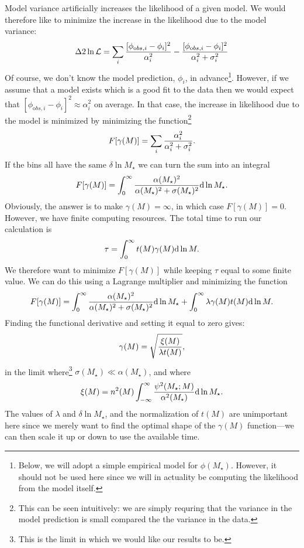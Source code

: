 Model variance artificially increases the likelihood of a given model. We would therefore like to minimize the increase in the likelihood due to the model variance:
\begin{equation}
\Delta 2 \ln \mathcal{L} = \sum_i {[\phi_{{\mathrm obs},i} - \phi_i]^2 \over \alpha_i^2} - {[\phi_{{\mathrm obs},i} - \phi_i]^2 \over \alpha_i^2 + \sigma_i^2} 
\end{equation}
Of course, we don't know the model prediction, $\phi_i$, in advance\footnote{Below, we will adopt a simple empirical model for $\phi(M_\star)$. However, it should not be used here since we will in actuality be computing the likelihood from the model itself.}. However, if we assume that a model exists which is a good fit to the data then we would expect that $[\phi_{{\mathrm obs},i} - \phi_i]^2 \approx \alpha_i^2$ on average. In that case, the increase in likelihood due to the model is minimized by minimizing the function\footnote{This can be seen intuitively: we are simply requring that the variance in the model prediction is small compared the the variance in the data.}
\begin{equation}
 F[\gamma(M)] = \sum_i {\alpha_i^2 \over \alpha_i^2 + \sigma_i^2}.
\end{equation}
If the bins all have the same $\delta \ln M_\star$ we can turn the sum into an integral
\begin{equation}
 F[\gamma(M)] = \int_0^\infty {\alpha(M_\star)^2 \over \alpha(M_\star)^2 + \sigma(M_\star)^2} \d \ln M_\star.
\end{equation}
Obviously, the answer is to make $\gamma(M)=\infty$, in which case $ F[\gamma(M)]=0$. However, we have finite computing resources. The total time to run our calculation is
\begin{equation}
 \tau = \int_0^\infty t(M) \gamma(M) \d \ln M.
\end{equation}
We therefore want to minimize $F[\gamma(M)]$ while keeping $\tau$ equal to some finite value. We can do this using a Lagrange multiplier and minimizing the function
\begin{equation}
  F[\gamma(M)] = \int_0^\infty {\alpha(M_\star)^2 \over \alpha(M_\star)^2 + \sigma(M_\star)^2} \d \ln M_\star + \int_0^\infty \lambda \gamma(M) t(M) \d \ln M.
\end{equation}
Finding the functional derivative and setting it equal to zero gives:
\begin{equation}
 \gamma(M) = \sqrt{{\xi(M) \over \lambda t(M)}},
\end{equation}
in the limit where\footnote{This is the limit in which we would like our results to be.} $\sigma(M_\star) \ll \alpha(M_\star)$, and where
\begin{equation}
 \xi(M) = n^2(M) \int_{-\infty}^\infty {\psi^2(M_\star;M) \over \alpha^2(M_\star)} \d \ln M_\star.
\end{equation}
The values of $\lambda$ and $\delta \ln M_\star$, and the normalization of $t(M)$ are unimportant here since we merely want to find the optimal shape of the $\gamma(M)$ function---we can then scale it up or down to use the available time.

